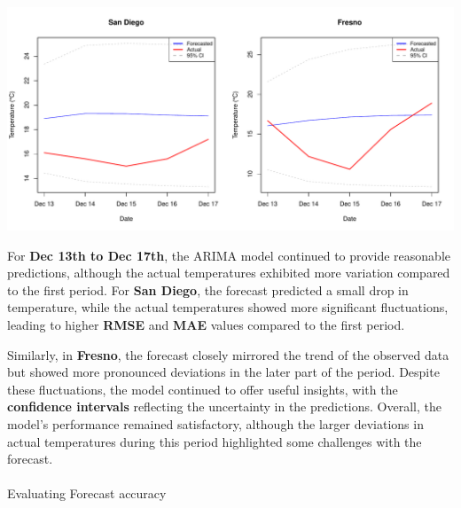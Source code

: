 \documentclass[
  11pt,
]{article}
\makeatletter
\let\oldparagraph\paragraph
\renewcommand{\paragraph}{
    \@ifstar
      \xxxParagraphStar
      \xxxParagraphNoStar
  }
\newcommand{\xxxParagraphStar}[1]{\oldparagraph*{#1}\mbox{}}
\newcommand{\xxxParagraphNoStar}[1]{\oldparagraph{#1}\mbox{}}
\makeatother
\begin{document}
\includegraphics{project_files/figure-pdf/unnamed-chunk-92-1.pdf}

For \textbf{Dec 13th to Dec 17th}, the ARIMA model continued to provide
reasonable predictions, although the actual temperatures exhibited more
variation compared to the first period. For \textbf{San Diego}, the
forecast predicted a small drop in temperature, while the actual
temperatures showed more significant fluctuations, leading to higher
\textbf{RMSE} and \textbf{MAE} values compared to the first period.

Similarly, in \textbf{Fresno}, the forecast closely mirrored the trend
of the observed data but showed more pronounced deviations in the later
part of the period. Despite these fluctuations, the model continued to
offer useful insights, with the \textbf{confidence intervals} reflecting
the uncertainty in the predictions. Overall, the model's performance
remained satisfactory, although the larger deviations in actual
temperatures during this period highlighted some challenges with the
forecast.

\paragraph{Evaluating Forecast
accuracy}\label{evaluating-forecast-accuracy}
\end{document}
